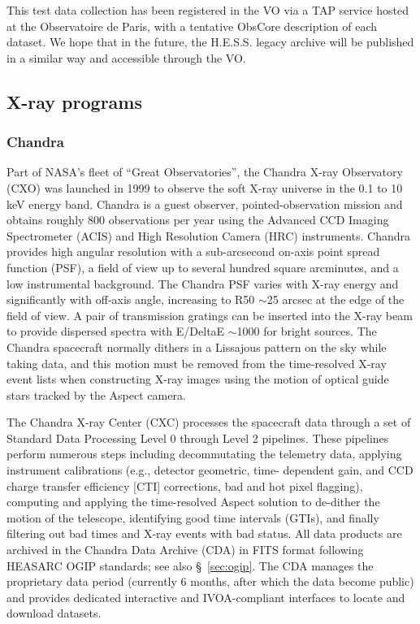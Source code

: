 \documentclass[11pt,a4paper]{ivoa}
\begin{document}
This test data collection has been registered in the VO via a TAP service hosted at the Observatoire de Paris, with a tentative ObsCore description of each dataset. We hope that in the future, the H.E.S.S. legacy archive will be published in a similar way and accessible through the VO.



\subsection{X-ray programs}

\subsubsection{Chandra}\label{sec:chandra}

Part of NASA's fleet of ``Great Observatories'', the Chandra X-ray Observatory (CXO) was launched in 1999 to observe the soft X-ray universe in the 0.1 to 10 keV energy band.  Chandra is a guest observer, pointed-observation mission and obtains roughly 800 observations per year using the Advanced CCD Imaging Spectrometer (ACIS) and High Resolution Camera (HRC) instruments.  Chandra provides high angular resolution with a sub-arcsecond on-axis point spread function (PSF), a field of view up to several hundred square arcminutes, and a low instrumental background. The Chandra PSF varies with X-ray energy and significantly with off-axis angle, increasing to R50 $\sim$25 arcsec at the edge of the field of view. A pair of transmission gratings can be inserted into the X-ray beam to provide dispersed spectra with E/DeltaE $\sim$1000 for bright sources.
The Chandra spacecraft normally dithers in a Lissajous pattern on the sky while taking data, and this motion must be removed from the time-resolved X-ray event lists when constructing X-ray images using the motion of optical guide stars tracked by the Aspect camera.

The Chandra X-ray Center (CXC) processes the spacecraft data through a set of Standard Data Processing Level 0 through Level 2 pipelines.  These pipelines perform numerous steps including decommutating the telemetry data, applying instrument calibrations (e.g., detector geometric, time- dependent gain, and CCD charge transfer efficiency [CTI] corrections, bad and hot pixel flagging), computing and applying the time-resolved Aspect solution to de-dither the motion of the telescope, identifying good time intervals (GTIs), and finally filtering out bad times and X-ray events with bad status.  All data products are archived in the Chandra Data Archive (CDA) in FITS format following HEASARC OGIP standards;  see also \S~\ref{sec:ogip}.  The CDA manages the proprietary data period (currently 6 months, after which the data become public) and provides dedicated interactive and IVOA-compliant interfaces to locate and download datasets.
\end{document}

